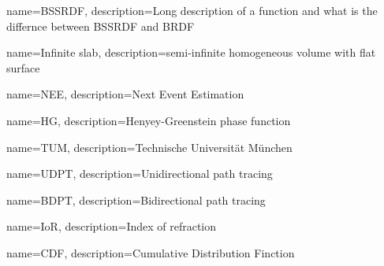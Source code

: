{
    name={BSSRDF},
    description={Long description of a function and what is the differnce
    between BSSRDF and BRDF}
}

{
    name={Infinite slab},
    description={semi-infinite homogeneous volume with flat surface}
}

{
    name={NEE},
    description={Next Event Estimation}
}

{
    name={HG},
    description={Henyey-Greenstein phase function}
}

{
    name={TUM},
    description={Technische Universität München}
}

{
    name={UDPT},
    description={Unidirectional path tracing}
}

{
    name={BDPT},
    description={Bidirectional path tracing}
}

{
    name={IoR},
    description={Index of refraction}
}

{
    name={CDF},
    description={Cumulative Distribution Finction}
}